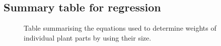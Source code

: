 \documentclass[10pt]{book} %
\begin{document}





\newpage
\subsection{Summary table for regression}
\begin{figure}[h!]
\begin{center}

\end{center}
\caption{Table summarising the equations used to determine weights of individual plant parts by using their size.}
\end{figure}
\end{document}
